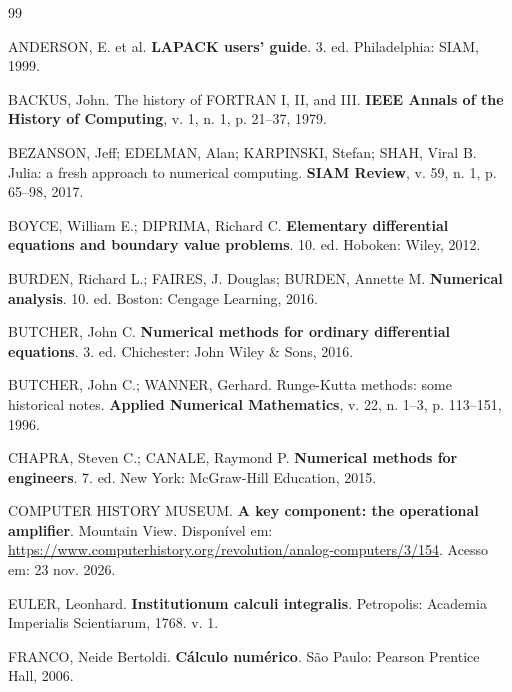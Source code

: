 \begin{thebibliography}{99}

ANDERSON, E. et al. \textbf{LAPACK users' guide}. 3. ed. Philadelphia: SIAM, 1999.

BACKUS, John. The history of FORTRAN I, II, and III. \textbf{IEEE Annals of the History of Computing}, v. 1, n. 1, p. 21--37, 1979.

BEZANSON, Jeff; EDELMAN, Alan; KARPINSKI, Stefan; SHAH, Viral B. Julia: a fresh approach to numerical computing. \textbf{SIAM Review}, v. 59, n. 1, p. 65--98, 2017.

BOYCE, William E.; DIPRIMA, Richard C. \textbf{Elementary differential equations and boundary value problems}. 10. ed. Hoboken: Wiley, 2012.

BURDEN, Richard L.; FAIRES, J. Douglas; BURDEN, Annette M. \textbf{Numerical analysis}. 10. ed. Boston: Cengage Learning, 2016.

BUTCHER, John C. \textbf{Numerical methods for ordinary differential equations}. 3. ed. Chichester: John Wiley \& Sons, 2016.

BUTCHER, John C.; WANNER, Gerhard. Runge-Kutta methods: some historical notes. \textbf{Applied Numerical Mathematics}, v. 22, n. 1--3, p. 113--151, 1996.

CHAPRA, Steven C.; CANALE, Raymond P. \textbf{Numerical methods for engineers}. 7. ed. New York: McGraw-Hill Education, 2015.

COMPUTER HISTORY MUSEUM. \textbf{A key component: the operational amplifier}. Mountain View. Disponível em: \url{https://www.computerhistory.org/revolution/analog-computers/3/154}. Acesso em: 23 nov. 2026.

EULER, Leonhard. \textbf{Institutionum calculi integralis}. Petropolis: Academia Imperialis Scientiarum, 1768. v. 1.

FRANCO, Neide Bertoldi. \textbf{Cálculo numérico}. São Paulo: Pearson Prentice Hall, 2006.


\end{thebibliography}
